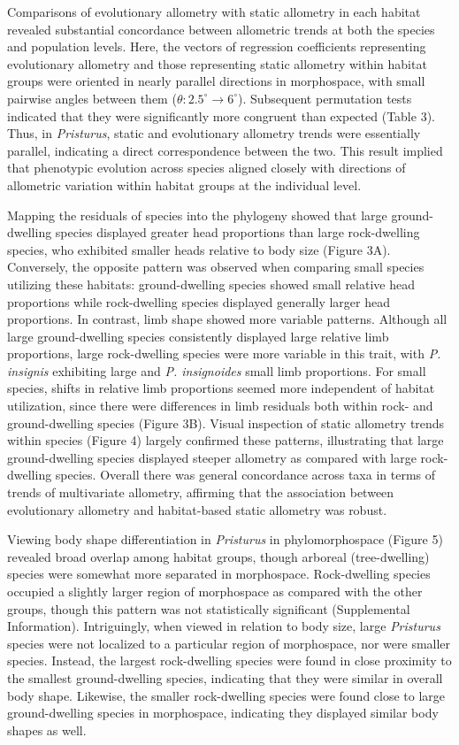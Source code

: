 \documentclass[
  11pt,
]{article}
\begin{document}
Comparisons of evolutionary allometry with static allometry in each
habitat revealed substantial concordance between allometric trends at
both the species and population levels. Here, the vectors of regression
coefficients representing evolutionary allometry and those representing
static allometry within habitat groups were oriented in nearly parallel
directions in morphospace, with small pairwise angles between them
(\(\theta: 2.5^\circ\rightarrow6^\circ\)). Subsequent permutation tests
indicated that they were significantly more congruent than expected
(Table 3). Thus, in \emph{Pristurus}, static and evolutionary allometry
trends were essentially parallel, indicating a direct correspondence
between the two. This result implied that phenotypic evolution across
species aligned closely with directions of allometric variation within
habitat groups at the individual level. \hfill\break

Mapping the residuals of species into the phylogeny showed that large
ground-dwelling species displayed greater head proportions than large
rock-dwelling species, who exhibited smaller heads relative to body size
(Figure 3A). Conversely, the opposite pattern was observed when
comparing small species utilizing these habitats: ground-dwelling
species showed small relative head proportions while rock-dwelling
species displayed generally larger head proportions. In contrast, limb
shape showed more variable patterns. Although all large ground-dwelling
species consistently displayed large relative limb proportions, large
rock-dwelling species were more variable in this trait, with \emph{P.
insignis} exhibiting large and \emph{P. insignoides} small limb
proportions. For small species, shifts in relative limb proportions
seemed more independent of habitat utilization, since there were
differences in limb residuals both within rock- and ground-dwelling
species (Figure 3B). Visual inspection of static allometry trends within
species (Figure 4) largely confirmed these patterns, illustrating that
large ground-dwelling species displayed steeper allometry as compared
with large rock-dwelling species. Overall there was general concordance
across taxa in terms of trends of multivariate allometry, affirming that
the association between evolutionary allometry and habitat-based static
allometry was robust. \hfill\break

Viewing body shape differentiation in \emph{Pristurus} in
phylomorphospace (Figure 5) revealed broad overlap among habitat groups,
though arboreal (tree-dwelling) species were somewhat more separated in
morphospace. Rock-dwelling species occupied a slightly larger region of
morphospace as compared with the other groups, though this pattern was
not statistically significant (Supplemental Information). Intriguingly,
when viewed in relation to body size, large \emph{Pristurus} species
were not localized to a particular region of morphospace, nor were
smaller species. Instead, the largest rock-dwelling species were found
in close proximity to the smallest ground-dwelling species, indicating
that they were similar in overall body shape. Likewise, the smaller
rock-dwelling species were found close to large ground-dwelling species
in morphospace, indicating they displayed similar body shapes as well.
\hfill\break 
\end{document}
